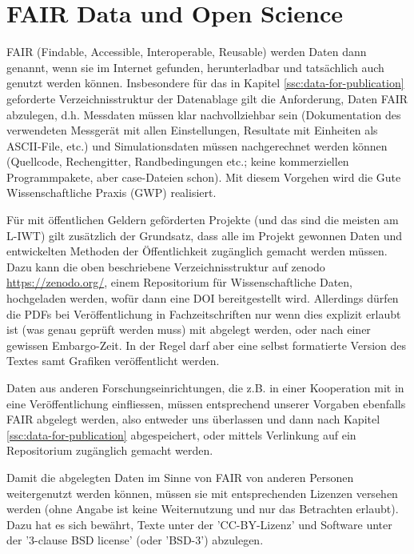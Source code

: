 \section{FAIR Data und Open Science}\label{ssc:FAIR-Data}

FAIR (Findable, Accessible, Interoperable, Reusable) werden Daten dann genannt, wenn sie im Internet gefunden, herunterladbar und tatsächlich auch genutzt werden können. Insbesondere für das in Kapitel \ref{ssc:data-for-publication} geforderte Verzeichnisstruktur der Datenablage gilt die Anforderung, Daten FAIR abzulegen, d.h. Messdaten müssen klar nachvollziehbar sein (Dokumentation des verwendeten Messgerät mit allen Einstellungen, Resultate mit Einheiten als ASCII-File, etc.) und Simulationsdaten müssen nachgerechnet werden können (Quellcode, Rechengitter, Randbedingungen etc.; keine kommerziellen Programmpakete, aber case-Dateien schon). Mit diesem Vorgehen wird die Gute Wissenschaftliche Praxis (GWP) realisiert.

Für mit öffentlichen Geldern geförderten Projekte (und das sind die meisten am L-IWT) gilt zusätzlich der Grundsatz, dass alle im Projekt gewonnen Daten und entwickelten Methoden der Öffentlichkeit zugänglich gemacht werden müssen. Dazu kann die oben beschriebene Verzeichnisstruktur auf zenodo \url{https://zenodo.org/}, einem Repositorium für Wissenschaftliche Daten, hochgeladen werden, wofür dann eine DOI bereitgestellt wird. Allerdings dürfen die PDFs bei Veröffentlichung in Fachzeitschriften nur wenn dies explizit erlaubt ist (was genau geprüft werden muss) mit abgelegt werden, oder nach einer gewissen Embargo-Zeit. In der Regel darf aber eine selbst formatierte Version des Textes samt Grafiken veröffentlicht werden.

Daten aus anderen Forschungseinrichtungen, die z.B. in einer Kooperation mit in eine Veröffentlichung einfliessen, müssen entsprechend unserer Vorgaben ebenfalls FAIR abgelegt werden, also entweder uns überlassen und dann nach Kapitel \ref{ssc:data-for-publication} abgespeichert, oder mittels Verlinkung auf ein Repositorium zugänglich gemacht werden.

Damit die abgelegten Daten im Sinne von FAIR von anderen Personen weitergenutzt werden können, müssen sie mit entsprechenden Lizenzen versehen werden (ohne Angabe ist keine Weiternutzung und nur das Betrachten erlaubt).
Dazu hat es sich bewährt, Texte unter der 'CC-BY-Lizenz' und Software unter der '3-clause BSD license' (oder 'BSD-3') abzulegen.

